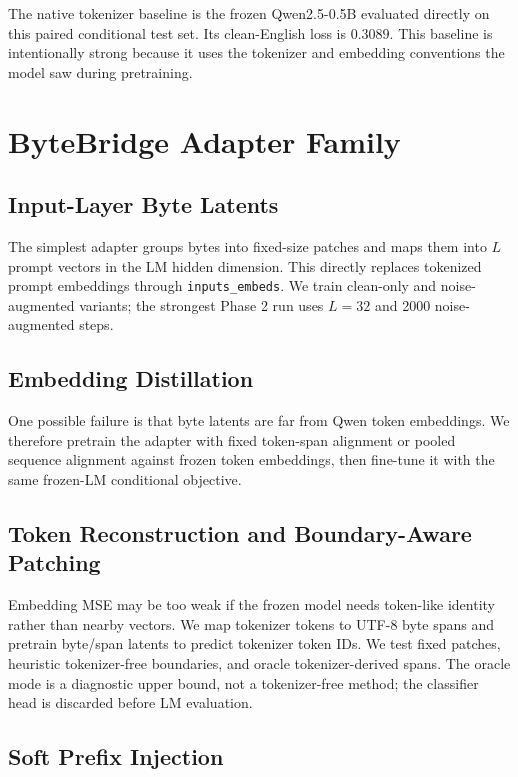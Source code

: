 \documentclass[runningheads]{llncs}
\newcommand{\qwen}{Qwen2.5-0.5B}
\begin{document}
The native tokenizer baseline is the frozen \qwen{} evaluated directly on this paired conditional test set. Its clean-English loss is $0.3089$. This baseline is intentionally strong because it uses the tokenizer and embedding conventions the model saw during pretraining.

\section{ByteBridge Adapter Family}

\subsection{Input-Layer Byte Latents}

The simplest adapter groups bytes into fixed-size patches and maps them into $L$ prompt vectors in the LM hidden dimension. This directly replaces tokenized prompt embeddings through \texttt{inputs\_embeds}. We train clean-only and noise-augmented variants; the strongest Phase 2 run uses $L=32$ and 2000 noise-augmented steps.

\subsection{Embedding Distillation}

One possible failure is that byte latents are far from Qwen token embeddings. We therefore pretrain the adapter with fixed token-span alignment or pooled sequence alignment against frozen token embeddings, then fine-tune it with the same frozen-LM conditional objective.

\subsection{Token Reconstruction and Boundary-Aware Patching}

Embedding MSE may be too weak if the frozen model needs token-like identity rather than nearby vectors. We map tokenizer tokens to UTF-8 byte spans and pretrain byte/span latents to predict tokenizer token IDs. We test fixed patches, heuristic tokenizer-free boundaries, and oracle tokenizer-derived spans. The oracle mode is a diagnostic upper bound, not a tokenizer-free method; the classifier head is discarded before LM evaluation.

\subsection{Soft Prefix Injection}
\end{document}

